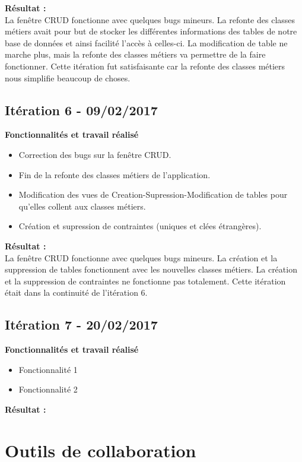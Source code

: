 \textbf{Résultat :}\\
La fenêtre CRUD fonctionne avec quelques bugs mineurs.
La refonte des classes métiers avait pour but de stocker les différentes informations des tables de notre base de données et ainsi facilité l'accès à celles-ci.
La modification de table ne marche plus, mais la refonte des classes métiers va permettre de la faire fonctionner.
Cette itération fut satisfaisante car la refonte des classes métiers nous simplifie beaucoup de choses. 

\subsection{Itération 6 - 09/02/2017}
\textbf{Fonctionnalités et travail réalisé}
\begin{itemize}
\item Correction des bugs sur la fenêtre CRUD.
\item Fin de la refonte des classes métiers de l'application.
\item Modification des vues de Creation-Supression-Modification de tables pour qu'elles collent aux classes métiers.
\item Création et supression de contraintes (uniques et clées étrangères).\\
\end{itemize}

\textbf{Résultat :}\\
La fenêtre CRUD fonctionne avec quelques bugs mineurs.
La création et la suppression de tables fonctionnent avec les nouvelles classes métiers.
La création et la suppression de contraintes ne fonctionne pas totalement.
Cette itération était dans la continuité de l'itération 6. 

\subsection{Itération 7 - 20/02/2017}
\textbf{Fonctionnalités et travail réalisé}
\begin{itemize}
\item Fonctionnalité 1
\item Fonctionnalité 2 \\
\end{itemize}

\textbf{Résultat :}\\


\section{Outils de collaboration}

